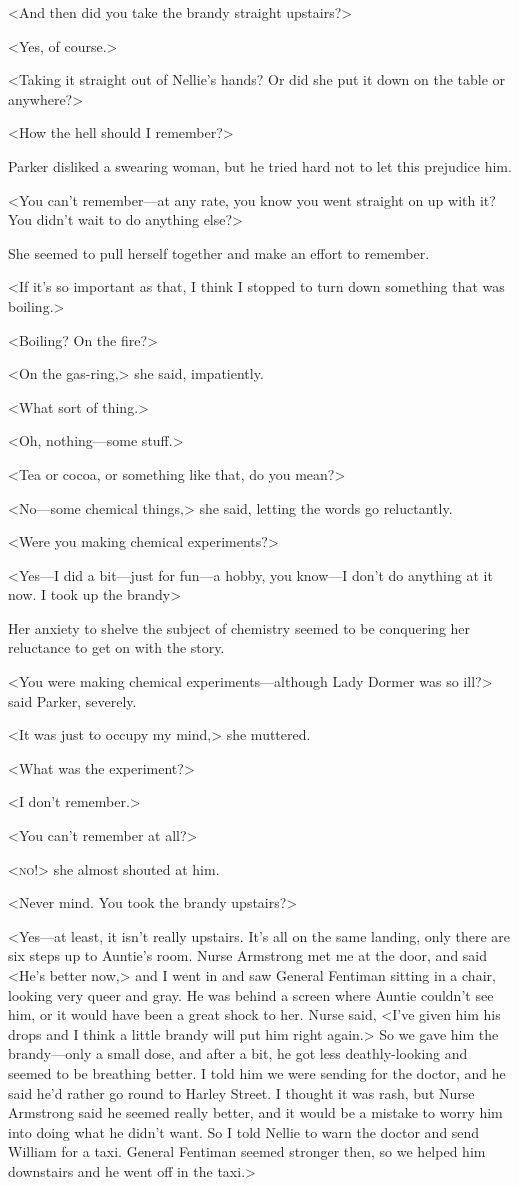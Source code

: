 <And then did you take the brandy straight upstairs?>

<Yes, of course.>

<Taking it straight out of Nellie's hands? Or did she put it down on the table or anywhere?>

<How the hell should I remember?>

Parker disliked a swearing woman, but he tried hard not to let this prejudice him.

<You can't remember—at any rate, you know you went straight on up with it? You didn't wait to do anything else?>

She seemed to pull herself together and make an effort to remember.

<If it's so important as that, I think I stopped to turn down something that was boiling.>

<Boiling? On the fire?>

<On the gas-ring,> she said, impatiently.

<What sort of thing.>

<Oh, nothing—some stuff.>

<Tea or cocoa, or something like that, do you mean?>

<No—some chemical things,> she said, letting the words go reluctantly.

<Were you making chemical experiments?>

<Yes—I did a bit—just for fun—a hobby, you know—I don't do anything at it now. I took up the brandy\longdash>

Her anxiety to shelve the subject of chemistry seemed to be conquering her reluctance to get on with the story.

<You were making chemical experiments—although Lady Dormer was so ill?> said Parker, severely.

<It was just to occupy my mind,> she muttered.

<What was the experiment?>

<I don't remember.>

<You can't remember at all?>

<\textsc{no}!> she almost shouted at him.

<Never mind. You took the brandy upstairs?>

<Yes—at least, it isn't really upstairs. It's all on the same landing, only there are six steps up to Auntie's room. Nurse Armstrong met me at the door, and said <He's better now,> and I went in and saw General Fentiman sitting in a chair, looking very queer and gray. He was behind a screen where Auntie couldn't see him, or it would have been a great shock to her. Nurse said, <I've given him his drops and I think a little brandy will put him right again.> So we gave him the brandy—only a small dose, and after a bit, he got less deathly-looking and seemed to be breathing better. I told him we were sending for the doctor, and he said he'd rather go round to Harley Street. I thought it was rash, but Nurse Armstrong said he seemed really better, and it would be a mistake to worry him into doing what he didn't want. So I told Nellie to warn the doctor and send William for a taxi. General Fentiman seemed stronger then, so we helped him downstairs and he went off in the taxi.>

